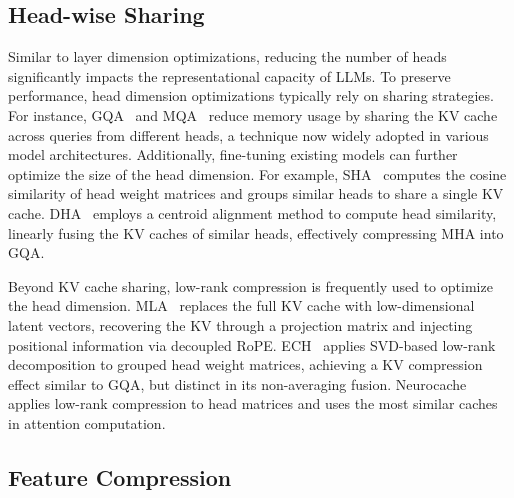 \subsection{Head-wise Sharing}\label{sec3_4}

Similar to layer dimension optimizations, reducing the number of heads significantly impacts the representational capacity of LLMs. To preserve performance, head dimension optimizations typically rely on sharing strategies. For instance, GQA~\citep{ainslie2023gqa} and MQA~\citep{shazeer2019fast} reduce memory usage by sharing the KV cache across queries from different heads, a technique now widely adopted in various model architectures. Additionally, fine-tuning existing models can further optimize the size of the head dimension. For example, SHA~\citep{cao2024head} computes the cosine similarity of head weight matrices and groups similar heads to share a single KV cache. DHA~\citep{chen2024dha} employs a centroid alignment method to compute head similarity, linearly fusing the KV caches of similar heads, effectively compressing MHA into GQA.

Beyond KV cache sharing, low-rank compression is frequently used to optimize the head dimension. MLA~\citep{liu2024deepseek} replaces the full KV cache with low-dimensional latent vectors, recovering the KV through a projection matrix and injecting positional information via decoupled RoPE. ECH~\citep{yu2024effectively} applies SVD-based low-rank decomposition to grouped head weight matrices, achieving a KV compression effect similar to GQA, but distinct in its non-averaging fusion. Neurocache~\citep{safaya2024neurocache} applies low-rank compression to head matrices and uses the most similar caches in attention computation.


\subsection{Feature Compression}\label{sec3_5}


